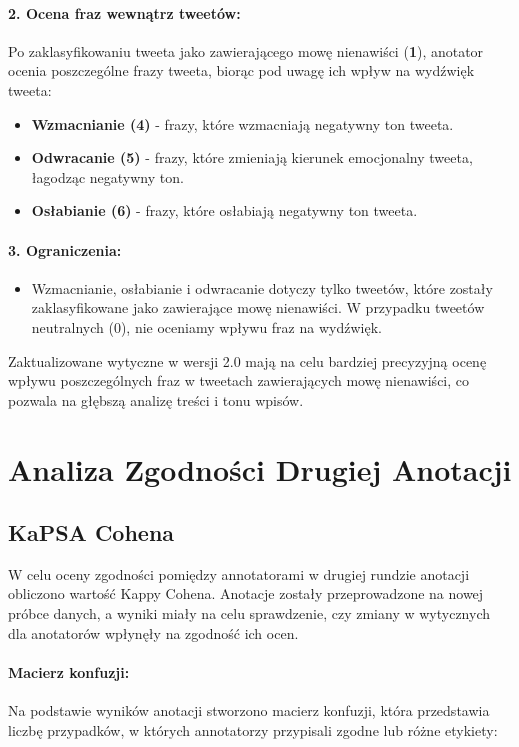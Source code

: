 \documentclass[12pt]{article}
\begin{document}
\paragraph{2. Ocena fraz wewnątrz tweetów:}
Po zaklasyfikowaniu tweeta jako zawierającego mowę nienawiści (\textbf{1}), anotator ocenia poszczególne frazy tweeta, biorąc pod uwagę ich wpływ na wydźwięk tweeta:
\begin{itemize}
    \item \textbf{Wzmacnianie (4)} - frazy, które wzmacniają negatywny ton tweeta.
    \item \textbf{Odwracanie (5)} - frazy, które zmieniają kierunek emocjonalny tweeta, łagodząc negatywny ton.
    \item \textbf{Osłabianie (6)} - frazy, które osłabiają negatywny ton tweeta.
\end{itemize}

\paragraph{3. Ograniczenia:}
\begin{itemize}
    \item Wzmacnianie, osłabianie i odwracanie dotyczy tylko tweetów, które zostały zaklasyfikowane jako zawierające mowę nienawiści. W przypadku tweetów neutralnych (0), nie oceniamy wpływu fraz na wydźwięk.
\end{itemize}

Zaktualizowane wytyczne w wersji 2.0 mają na celu bardziej precyzyjną ocenę wpływu poszczególnych fraz w tweetach zawierających mowę nienawiści, co pozwala na głębszą analizę treści i tonu wpisów.

\section{Analiza Zgodności Drugiej Anotacji}

\subsection{KaPSA Cohena}

W celu oceny zgodności pomiędzy annotatorami w drugiej rundzie anotacji obliczono wartość Kappy Cohena. Anotacje zostały przeprowadzone na nowej próbce danych, a wyniki miały na celu sprawdzenie, czy zmiany w wytycznych dla anotatorów wpłynęły na zgodność ich ocen.

\paragraph{Macierz konfuzji:}
Na podstawie wyników anotacji stworzono macierz konfuzji, która przedstawia liczbę przypadków, w których annotatorzy przypisali zgodne lub różne etykiety:
\end{document}
